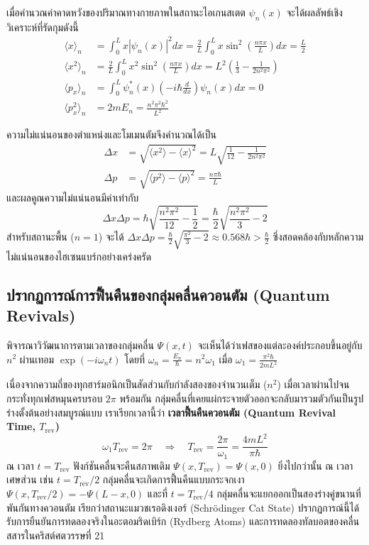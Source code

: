 เมื่อคำนวณค่าคาดหวังของปริมาณทางกายภาพในสถานะไอเกนสเตต $\psi_n(x)$ จะได้ผลลัพธ์เชิงวิเคราะห์ที่รัดกุมดังนี้
\begin{align}
\langle x \rangle_n &= \int_0^L x |\psi_n(x)|^2 dx = \frac{2}{L}\int_0^L x \sin^2\left(\frac{n\pi x}{L}\right) dx = \frac{L}{2} \\
\langle x^2 \rangle_n &= \frac{2}{L}\int_0^L x^2 \sin^2\left(\frac{n\pi x}{L}\right) dx = L^2 \left( \frac{1}{3} - \frac{1}{2n^2\pi^2} \right) \\
\langle p_x \rangle_n &= \int_0^L \psi_n^*(x) \left(-i\hbar\frac{d}{dx}\right) \psi_n(x) dx = 0 \\
\langle p_x^2 \rangle_n &= 2m E_n = \frac{n^2\pi^2\hbar^2}{L^2}
\end{align}

ความไม่แน่นอนของตำแหน่งและโมเมนตัมจึงคำนวณได้เป็น
\begin{align}
\Delta x &= \sqrt{\langle x^2 \rangle - \langle x \rangle^2} = L \sqrt{\frac{1}{12} - \frac{1}{2n^2\pi^2}} \\
\Delta p &= \sqrt{\langle p^2 \rangle - \langle p \rangle^2} = \frac{n\pi\hbar}{L}
\end{align}
และผลคูณความไม่แน่นอนมีค่าเท่ากับ
\begin{equation}
\Delta x \Delta p = \hbar \sqrt{\frac{n^2\pi^2}{12} - \frac{1}{2}} = \frac{\hbar}{2} \sqrt{\frac{n^2\pi^2}{3} - 2}
\end{equation}
สำหรับสถานะพื้น ($n=1$) จะได้ $\Delta x \Delta p = \frac{\hbar}{2} \sqrt{\frac{\pi^2}{3} - 2} \approx 0.568 \hbar > \frac{\hbar}{2}$ ซึ่งสอดคล้องกับหลักความไม่แน่นอนของไฮเซนแบร์กอย่างเคร่งครัด

\subsection{ปรากฏการณ์การฟื้นคืนของกลุ่มคลื่นควอนตัม (Quantum Revivals)}
พิจารณาวิวัฒนาการตามเวลาของกลุ่มคลื่น $\Psi(x, t)$ จะเห็นได้ว่าเฟสของแต่ละองค์ประกอบขึ้นอยู่กับ $n^2$ ผ่านเทอม $\exp(-i\omega_n t)$ โดยที่ $\omega_n = \frac{E_n}{\hbar} = n^2 \omega_1$ เมื่อ $\omega_1 = \frac{\pi^2\hbar}{2mL^2}$

เนื่องจากความถี่ของทุกฮาร์มอนิกเป็นสัดส่วนกับกำลังสองของจำนวนเต็ม ($n^2$) เมื่อเวลาผ่านไปจนกระทั่งทุกเฟสหมุนครบรอบ $2\pi$ พร้อมกัน กลุ่มคลื่นที่เคยแผ่กระจายตัวออกจะกลับมารวมตัวกันเป็นรูปร่างตั้งต้นอย่างสมบูรณ์แบบ เราเรียกเวลานี้ว่า \textbf{เวลาฟื้นคืนควอนตัม (Quantum Revival Time, $T_{\text{rev}}$)}
\begin{equation}
\omega_1 T_{\text{rev}} = 2\pi \quad \Longrightarrow \quad T_{\text{rev}} = \frac{2\pi}{\omega_1} = \frac{4mL^2}{\pi\hbar}
\end{equation}
ณ เวลา $t = T_{\text{rev}}$ ฟังก์ชันคลื่นจะคืนสภาพเดิม $\Psi(x, T_{\text{rev}}) = \Psi(x, 0)$ ยิ่งไปกว่านั้น ณ เวลาเศษส่วน เช่น $t = T_{\text{rev}}/2$ กลุ่มคลื่นจะเกิดการฟื้นคืนแบบกระจกเงา $\Psi(x, T_{\text{rev}}/2) = -\Psi(L-x, 0)$ และที่ $t = T_{\text{rev}}/4$ กลุ่มคลื่นจะแยกออกเป็นสองร่างคู่ขนานที่พันกันทางควอนตัม เรียกว่าสถานะแมวชเรอดิงเงอร์ (Schrödinger Cat State) ปรากฏการณ์นี้ได้รับการยืนยันการทดลองจริงในอะตอมริดเบิร์ก (Rydberg Atoms) และการทดลองทัลบอตของคลื่นสสารในคริสต์ศตวรรษที่ 21

